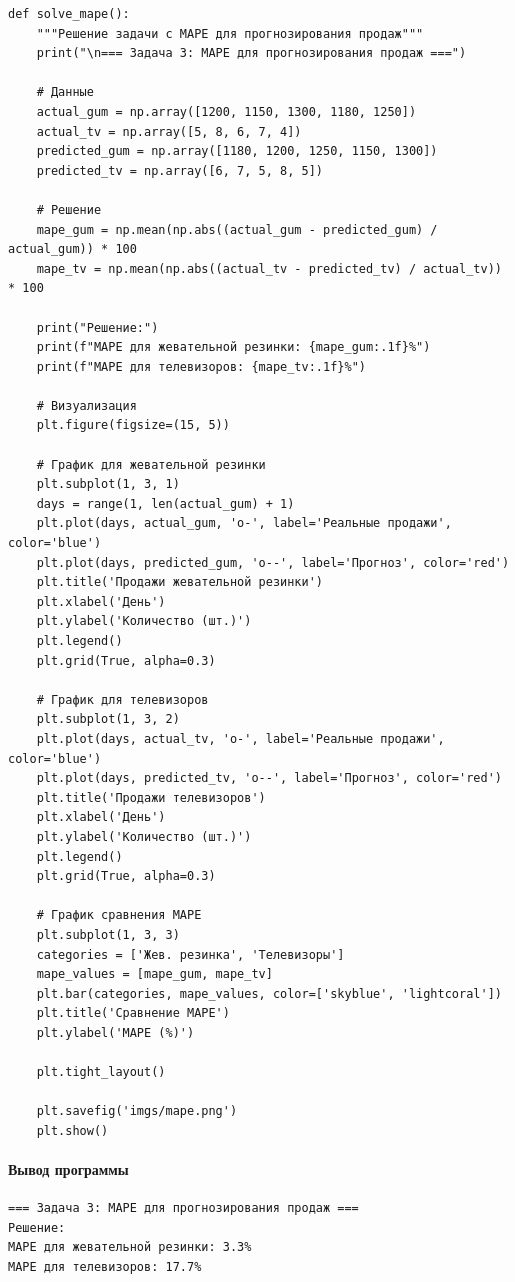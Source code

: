 \begin{verbatim}
def solve_mape():
    """Решение задачи с MAPE для прогнозирования продаж"""
    print("\n=== Задача 3: MAPE для прогнозирования продаж ===")
    
    # Данные
    actual_gum = np.array([1200, 1150, 1300, 1180, 1250])
    actual_tv = np.array([5, 8, 6, 7, 4])
    predicted_gum = np.array([1180, 1200, 1250, 1150, 1300])
    predicted_tv = np.array([6, 7, 5, 8, 5])
    
    # Решение
    mape_gum = np.mean(np.abs((actual_gum - predicted_gum) / actual_gum)) * 100
    mape_tv = np.mean(np.abs((actual_tv - predicted_tv) / actual_tv)) * 100
    
    print("Решение:")
    print(f"MAPE для жевательной резинки: {mape_gum:.1f}%")
    print(f"MAPE для телевизоров: {mape_tv:.1f}%")
    
    # Визуализация
    plt.figure(figsize=(15, 5))
    
    # График для жевательной резинки
    plt.subplot(1, 3, 1)
    days = range(1, len(actual_gum) + 1)
    plt.plot(days, actual_gum, 'o-', label='Реальные продажи', color='blue')
    plt.plot(days, predicted_gum, 'o--', label='Прогноз', color='red')
    plt.title('Продажи жевательной резинки')
    plt.xlabel('День')
    plt.ylabel('Количество (шт.)')
    plt.legend()
    plt.grid(True, alpha=0.3)
    
    # График для телевизоров
    plt.subplot(1, 3, 2)
    plt.plot(days, actual_tv, 'o-', label='Реальные продажи', color='blue')
    plt.plot(days, predicted_tv, 'o--', label='Прогноз', color='red')
    plt.title('Продажи телевизоров')
    plt.xlabel('День')
    plt.ylabel('Количество (шт.)')
    plt.legend()
    plt.grid(True, alpha=0.3)
    
    # График сравнения MAPE
    plt.subplot(1, 3, 3)
    categories = ['Жев. резинка', 'Телевизоры']
    mape_values = [mape_gum, mape_tv]
    plt.bar(categories, mape_values, color=['skyblue', 'lightcoral'])
    plt.title('Сравнение MAPE')
    plt.ylabel('MAPE (%)')
    
    plt.tight_layout()
    
    plt.savefig('imgs/mape.png')
    plt.show()
\end{verbatim}
\paragraph{Вывод программы}
\begin{verbatim}
=== Задача 3: MAPE для прогнозирования продаж ===
Решение:
MAPE для жевательной резинки: 3.3%
MAPE для телевизоров: 17.7%
\end{verbatim}

